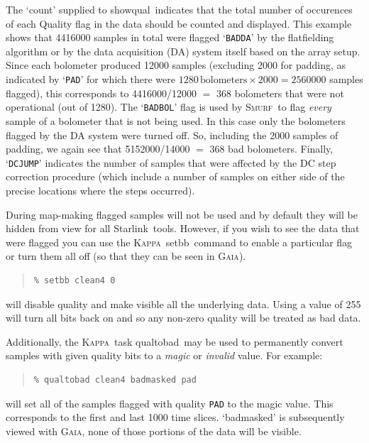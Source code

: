 \documentclass[twoside,11pt]{article}
\newcommand{\htmladdnormallink}[2]{#1}
\newcommand{\xref}[3]{#1}
\renewcommand{\_}{\texttt{\symbol{95}}}
\newenvironment{myquote}{\begin{quote}\begin{small}}{\end{small}\end{quote}}
\newcommand{\starlink}{\htmladdnormallink{Starlink}{http://starlink.jach.hawaii.edu}}
\newcommand{\Kappa}{\xref{\textsc{Kappa}}{sun95}{}}
\newcommand{\gaia}{\xref{\textsc{Gaia}}{sun214}{}}
\newcommand{\smurf}{\xref{\textsc{Smurf}}{sun258}{}}
\newcommand{\task}[1]{\textsf{#1}}
\newcommand{\qualtobad}{\xref{\task{qualtobad}}{sun95}{QUALTOBAD}}
\newcommand{\showqual}{\xref{\task{showqual}}{sun95}{SHOWQUAL}}
\newcommand{\setbb}{\xref{\task{setbb}}{sun95}{SETBB}}
\begin{document}
The `count' supplied to \showqual\ indicates that the total number of
occurences of each Quality flag in the data should be counted and
displayed.  This example shows that 4416000 samples in total were
flagged `\texttt{BADDA}' by the flatfielding algorithm or by the data
acquisition (DA) system itself based on the array setup. Since each
bolometer produced 12000 samples (excluding 2000 for padding, as
indicated by `\texttt{PAD}' for which there were $1280
\,\mathrm{bolometers} \times 2000 = 2560000$ samples flagged), this
corresponds to 4416000/12000 $=$ 368 bolometers that were not
operational (out of 1280). The `\texttt{BADBOL}' flag is used by
\smurf\ to flag {\em every} sample of a bolometer that is not being
used. In this case only the bolometers flagged by the DA system were
turned off. So, including the 2000 samples of padding, we again see
that 5152000/14000 $=$ 368 bad bolometers. Finally, `\texttt{DCJUMP}'
indicates the number of samples that were affected by the DC step
correction procedure (which include a number of samples on either side
of the precise locations where the steps occurred).


During map-making flagged samples will not be used and by default they
will be hidden from view for all \starlink\ tools. However, if you
wish to see the data that were flagged you can use the \Kappa\
\setbb\ command to enable a particular flag or turn them all off (so
that they can be seen in \gaia).

\begin{myquote}
\begin{verbatim}
% setbb clean4 0
\end{verbatim}
\end{myquote}

will disable quality and make visible all the underlying data. Using a
value of 255 will turn all bits back on and so any non-zero quality will be
treated as bad data.

Additionally, the \Kappa\ task \qualtobad\ may be used to
permanently convert samples with given quality bits to a {\em magic\/} or {\em
  invalid\/} value. For example:

\begin{myquote}
\begin{verbatim}
% qualtobad clean4 badmasked pad
\end{verbatim}
\end{myquote}
%
will set all of the samples flagged with quality \texttt{PAD} to the
magic value. This corresponds to the first and last 1000 time
slices. `badmasked' is subsequently viewed with \gaia, none of those portions
of the data will be visible.
\end{document}
